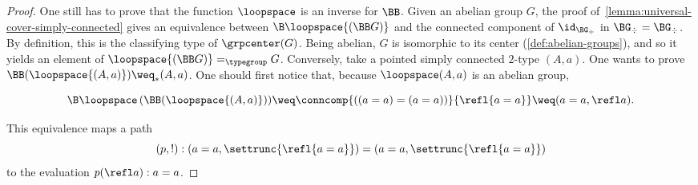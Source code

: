 \begin{proof}
  One still has to prove that the function $\loopspace$ is an inverse
  for $\BB$. Given an abelian group $G$, the proof
  of~\cref{lemma:universal-cover-simply-connected} gives an
  equivalence between $\B\loopspace {(\BB G)}$ and the connected
  component of $\id_{\BG_\div}$ in $\BG_\div=\BG_\div$. By
  definition, this is the classifying type of $\grpcenter(G)$. Being
  abelian, $G$ is isomorphic to its center
  (\cref{def:abelian-groups}), and so it yields an element of
  $\loopspace {(\BB G)} =_{\typegroup} G$. %
  Conversely, take a pointed simply connected $2$-type $(A,a)$. One
  wants to prove $\BB (\loopspace {(A,a)}) \weq_\ast (A,a)$. One
  should first notice that, because $\loopspace (A,a)$ is an abelian
  group,
  \begin{fullwidth}
  \begin{equation}
    \label{eq:loopspace-A-abelian}%
    {\B\loopspace \left( \BB (\loopspace {(A,a)}) \right)}
    \weq \conncomp{((a=a)=(a=a))}{\refl{a=a}} \weq (a=a,\refl a).
  \end{equation}
\end{fullwidth}
  This equivalence maps a path
  \begin{displaymath}
    (p,!):(a=a,\settrunc{\refl{a=a}})=(a=a,\settrunc{\refl{a=a}})
  \end{displaymath}
  to the evaluation $p(\refl a): a=a$.


\end{proof}
